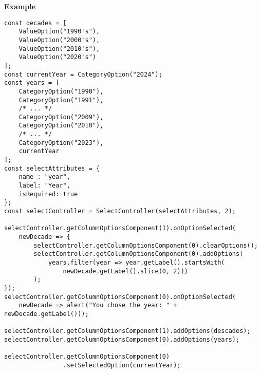 \vspace*{6pt}
\noindent
\textbf{Example}

\begin{lstlisting}[style = htmlcssjs, label = api:selectControllerExample]
const decades = [
    ValueOption("1990's"),
    ValueOption("2000's"),
    ValueOption("2010's"),
    ValueOption("2020's")
];
const currentYear = CategoryOption("2024");
const years = [
    CategoryOption("1990"),
    CategoryOption("1991"),
    /* ... */
    CategoryOption("2009"),
    CategoryOption("2010"),
    /* ... */
    CategoryOption("2023"),
    currentYear
];
const selectAttributes = { 
    name : "year", 
    label: "Year", 
    isRequired: true 
};
const selectController = SelectController(selectAttributes, 2);

selectController.getColumnOptionsComponent(1).onOptionSelected(
    newDecade => {
        selectController.getColumnOptionsComponent(0).clearOptions();
        selectController.getColumnOptionsComponent(0).addOptions(
            years.filter(year => year.getLabel().startsWith(
                newDecade.getLabel().slice(0, 2)))
        );
});
selectController.getColumnOptionsComponent(0).onOptionSelected(
    newDecade => alert("You chose the year: " + newDecade.getLabel()));

selectController.getColumnOptionsComponent(1).addOptions(descades);
selectController.getColumnOptionsComponent(0).addOptions(years);

selectController.getColumnOptionsComponent(0)
                .setSelectedOption(currentYear);
\end{lstlisting}